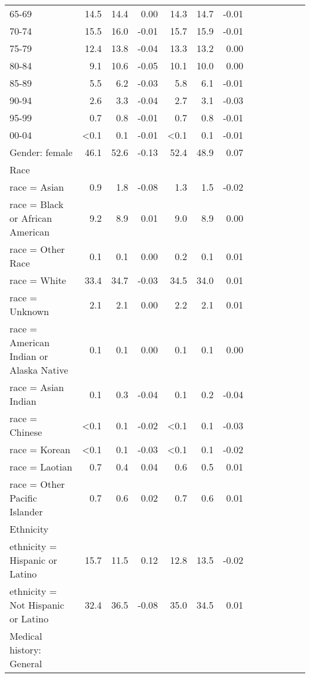 \documentclass[11pt,]{article}
\begin{document}
\begin{longtable}{lrrrrrrrrrrrr}
      65-69 & 14.5 & 14.4 &  0.00 & 14.3 & 14.7 & -0.01 \\ 
      70-74 & 15.5 & 16.0 & -0.01 & 15.7 & 15.9 & -0.01 \\ 
      75-79 & 12.4 & 13.8 & -0.04 & 13.3 & 13.2 &  0.00 \\ 
      80-84 &  9.1 & 10.6 & -0.05 & 10.1 & 10.0 &  0.00 \\ 
      85-89 &  5.5 &  6.2 & -0.03 &  5.8 &  6.1 & -0.01 \\ 
      90-94 &  2.6 &  3.3 & -0.04 &  2.7 &  3.1 & -0.03 \\ 
      95-99 &  0.7 &  0.8 & -0.01 &  0.7 &  0.8 & -0.01 \\ 
      00-04 & <0.1 &  0.1 & -0.01 & <0.1 &  0.1 & -0.01 \\ 
  Gender: female & 46.1 & 52.6 & -0.13 & 52.4 & 48.9 &  0.07 \\ 
  Race &    &    &     &    &    &     \\ 
      race = Asian &  0.9 &  1.8 & -0.08 &  1.3 &  1.5 & -0.02 \\ 
      race = Black or African American &  9.2 &  8.9 &  0.01 &  9.0 &  8.9 &  0.00 \\ 
      race = Other Race &  0.1 &  0.1 &  0.00 &  0.2 &  0.1 &  0.01 \\ 
      race = White & 33.4 & 34.7 & -0.03 & 34.5 & 34.0 &  0.01 \\ 
      race = Unknown &  2.1 &  2.1 &  0.00 &  2.2 &  2.1 &  0.01 \\ 
      race = American Indian or Alaska Native &  0.1 &  0.1 &  0.00 &  0.1 &  0.1 &  0.00 \\ 
      race = Asian Indian &  0.1 &  0.3 & -0.04 &  0.1 &  0.2 & -0.04 \\ 
      race = Chinese & <0.1 &  0.1 & -0.02 & <0.1 &  0.1 & -0.03 \\ 
      race = Korean & <0.1 &  0.1 & -0.03 & <0.1 &  0.1 & -0.02 \\ 
      race = Laotian &  0.7 &  0.4 &  0.04 &  0.6 &  0.5 &  0.01 \\ 
      race = Other Pacific Islander &  0.7 &  0.6 &  0.02 &  0.7 &  0.6 &  0.01 \\ 
  Ethnicity &    &    &     &    &    &     \\ 
      ethnicity = Hispanic or Latino & 15.7 & 11.5 &  0.12 & 12.8 & 13.5 & -0.02 \\ 
      ethnicity = Not Hispanic or Latino & 32.4 & 36.5 & -0.08 & 35.0 & 34.5 &  0.01 \\ 
  Medical history: General &    &    &     &    &    &     \\ 

\end{longtable}
\end{document}
